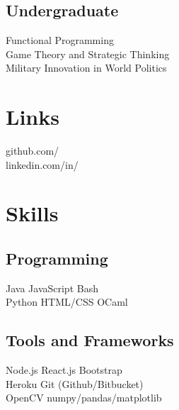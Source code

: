 \documentclass[]{deedy-resume-openfont}
\begin{document}
\begin{minipage}[t]{0.33\textwidth}
\subsection{Undergraduate}
Functional Programming \\
Game Theory and Strategic Thinking\\
Military Innovation in World Politics

\sectionsep


\section{Links} 
github.com/\href{https://github.com/kuang}{} \\
linkedin.com/in/\href{https://www.linkedin.com/in/kuangjustin}{} \\
\sectionsep

\section{Skills}
\subsection{Programming}
Java \textbullet{}   JavaScript \textbullet{} Bash \\
Python \textbullet{} HTML/CSS \textbullet OCaml
\newline
\newline

\subsection{Tools and Frameworks}
Node.js \textbullet{}   React.js \textbullet{} 
Bootstrap \textbullet{} \\
Heroku \textbullet{} 
Git (Github/Bitbucket) \\
OpenCV \textbullet numpy/pandas/matplotlib


\end{minipage}
\end{document}
